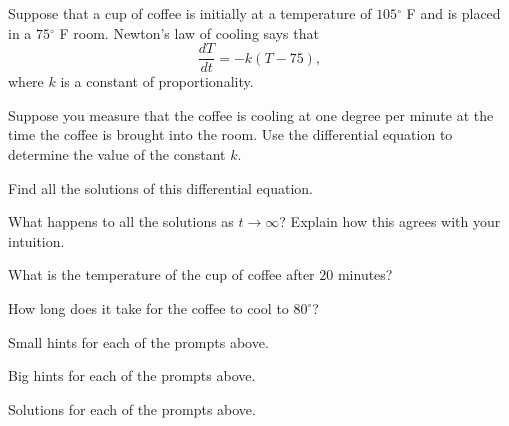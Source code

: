 \begin{activity} \label{A:7.4.2}  
  Suppose that a cup of coffee is initially at a temperature of
  $105$$^\circ$ F and is placed in a $75$$^\circ$ F room.  Newton's law of
  cooling says that 
  $$
  \frac{dT}{dt} = -k(T-75),
  $$ 
  where $k$ is a constant of proportionality.

\ba
\item Suppose you measure that the coffee is cooling at one degree per
  minute at the time the coffee is brought into the room.  Use the
  differential equation to determine the value of the constant $k$.

\item Find all the solutions of this differential equation.

\item What happens to all the solutions as $t\to\infty$?  Explain how
  this agrees with your intuition.

\item What is the temperature of the cup of coffee after $20$ minutes?

\item How long does it take for the coffee to cool to $80^\circ$?

\ea
\end{activity}
\begin{smallhint}
\ba
	\item Small hints for each of the prompts above.
\ea
\end{smallhint}
\begin{bighint}
\ba
	\item Big hints for each of the prompts above.
\ea
\end{bighint}
\begin{activitySolution}
\ba
	\item Solutions for each of the prompts above.
\ea
\end{activitySolution}
\aftera